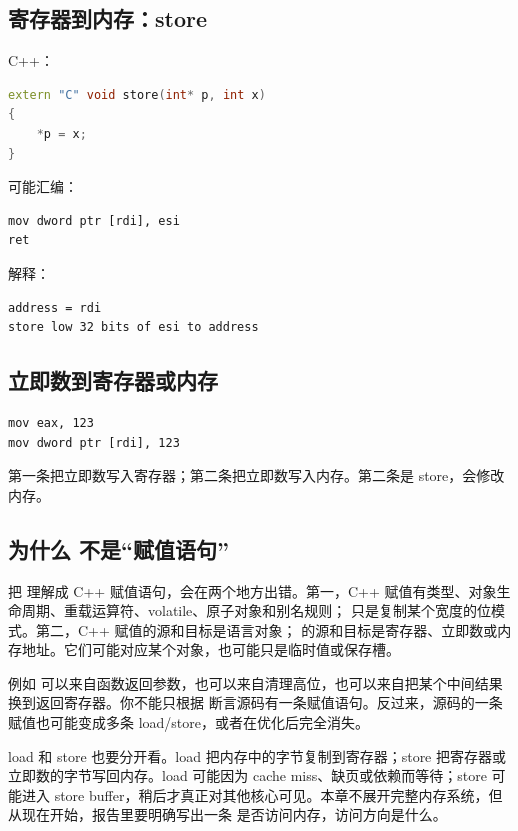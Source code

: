 \subsection{寄存器到内存：store}

C++：

\begin{lstlisting}[language=C++]
extern "C" void store(int* p, int x)
{
    *p = x;
}
\end{lstlisting}

可能汇编：

\begin{lstlisting}
mov dword ptr [rdi], esi
ret
\end{lstlisting}

解释：

\begin{lstlisting}
address = rdi
store low 32 bits of esi to address
\end{lstlisting}

\subsection{立即数到寄存器或内存}

\begin{lstlisting}
mov eax, 123
mov dword ptr [rdi], 123
\end{lstlisting}

第一条把立即数写入寄存器；第二条把立即数写入内存。第二条是 store，会修改内存。

\subsection{为什么  不是“赋值语句”}

把  理解成 C++ 赋值语句，会在两个地方出错。第一，C++ 赋值有类型、对象生命周期、重载运算符、volatile、原子对象和别名规则； 只是复制某个宽度的位模式。第二，C++ 赋值的源和目标是语言对象； 的源和目标是寄存器、立即数或内存地址。它们可能对应某个对象，也可能只是临时值或保存槽。

例如  可以来自函数返回参数，也可以来自清理高位，也可以来自把某个中间结果换到返回寄存器。你不能只根据  断言源码有一条赋值语句。反过来，源码的一条赋值也可能变成多条 load/store，或者在优化后完全消失。

load 和 store 也要分开看。load 把内存中的字节复制到寄存器；store 把寄存器或立即数的字节写回内存。load 可能因为 cache miss、缺页或依赖而等待；store 可能进入 store buffer，稍后才真正对其他核心可见。本章不展开完整内存系统，但从现在开始，报告里要明确写出一条  是否访问内存，访问方向是什么。

